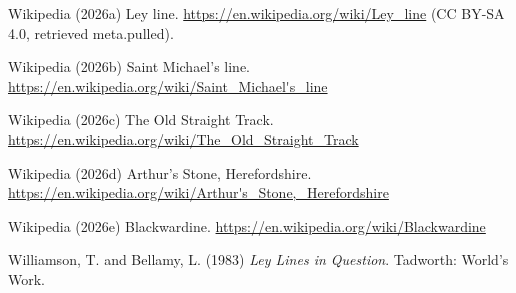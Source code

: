 \documentclass[11pt,a4paper]{article}
\begin{document}
\begin{description}
\item Wikipedia (2026a) Ley line. \url{https://en.wikipedia.org/wiki/Ley_line} (CC BY-SA 4.0, retrieved {{meta.pulled}}).
\item Wikipedia (2026b) Saint Michael's line. \url{https://en.wikipedia.org/wiki/Saint_Michael's_line}
\item Wikipedia (2026c) The Old Straight Track. \url{https://en.wikipedia.org/wiki/The_Old_Straight_Track}
\item Wikipedia (2026d) Arthur's Stone, Herefordshire. \url{https://en.wikipedia.org/wiki/Arthur's_Stone,_Herefordshire}
\item Wikipedia (2026e) Blackwardine. \url{https://en.wikipedia.org/wiki/Blackwardine}
\item Williamson, T. and Bellamy, L. (1983) \emph{Ley Lines in Question}. Tadworth: World's Work.
\end{description}
\end{document}
